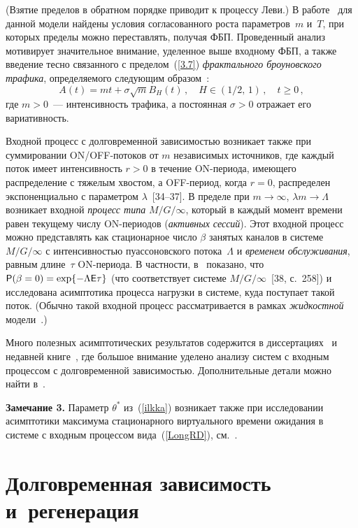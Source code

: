 \begin{multicols}{2}
(Взятие пределов в обратном порядке приводит к процессу Леви.) В
работе~\cite {Kaj} для данной модели найдены условия согласованного роста параметров~$m$ и~$T$,
 при которых пределы можно переставлять, получая ФБП. Проведенный анализ мотивирует значительное внимание, уделенное
выше входному ФБП, а также введение тесно связанного с пределом~(\ref{3.7})
{\it фрактального броуновского трафика}, определяемого следующим образом~\cite {Norros, Norr95}:
\begin{equation*}
A(t) =mt +\sigma \sqrt { m}B_H(t)\,, \quad H\in (1/2,\,1)\,,\quad t\ge 0\,,
\end{equation*}
где $m>0$~--- интенсивность трафика, а постоянная $\sigma>0$ отражает его вариативность.

 Входной процесс с долговременной зависи\-мостью возникает также при суммировании
ON/OFF-потоков от $m$ независимых источников, где каж\-дый поток имеет
интенсивность $r>0$ в течение ON-периода, имеющего распределение с
тяжелым хвостом, а OFF-период, когда $r=0$, распределен
экспоненциально с параметром $\lambda$~[34--37].
В пределе при $m\to \infty$, $\lambda m\to \Lambda$ возникает входной {\it процесс типа} $M/G/\infty$,
который в каждый момент времени равен текущему числу ON-периодов
({\it активных сессий}). Этот входной процесс можно представлять как
стационарное число $\beta$ занятых каналов в системе $M/G/\infty$ с
интенсивностью пуассоновского потока~$\Lambda$ и {\it временем
обслуживания}, равным длине~$\tau$ ON-периода. В частности, в~\cite{Jelenkovic} показано,
что ${\sf P}(\beta=0)=\exp\{-\Lambda{\sf E}\tau\}$ (что
соответствует сис\-те\-ме $M/G/\infty$~[38, с.~258]) и
исследована асимптотика процесса нагрузки в сис\-теме, куда поступает
такой поток. (Обычно такой входной процесс рассматривается в рамках
{\it жидкостной } модели~\cite {Jelenkovic}.)

Много полезных асимптотических результатов содержится в
 диссертациях~\cite{Deng, Zwart} и недавней книге~\cite{Mandjes}, где большое
 внимание уделено анализу сис\-тем с входным процессом с
долговременной зависимостью. Дополнительные детали можно найти в~\cite {SS}.

\smallskip
\noindent
{\bf Замечание 3.} Параметр $\theta^*$ из~(\ref{ilkka}) возникает
также при исследовании асимптотики максимума стационарного
виртуального времени ожидания в системе с входным процессом вида~(\ref{LongRD}), см.~\cite{GZ}.

\section{Долговременная зависимость и~регенерация}


\end{multicols}
